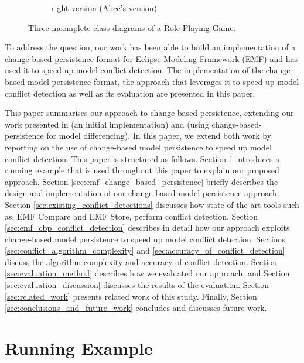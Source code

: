 \begin{figure}[]
\begin{subfigure}[t]{0.31\linewidth}
\caption{right version (Alice's version)}
\label{fig:class_diagram_right}
\end{subfigure}
\caption{Three incomplete class diagrams of a Role Playing Game.}
\label{fig:class_diagram_rpg}
\end{figure}

To address the question, our work has been able to build an implementation of a change-based persistence format for Eclipse Modeling Framework (EMF) \cite{eclipse2019emf} and has used it to speed up model conflict detection. The implementation of the change-based model persistence format, the approach that leverages it to speed up model conflict detection as well as its evaluation are presented in this paper. 

This paper summarises our approach to change-based persistence, extending our work presented in \cite{DBLP:conf/models/YohannisKP17} (an initial implementation) and \cite{yohannis2019efficient} (using change-based-persistence for model differencing). In this paper, we extend both work \cite{DBLP:conf/models/YohannisKP17,yohannis2019efficient} by reporting on the use of change-based model persistence to speed up model conflict detection. This paper is structured as follows. Section \ref{sec:running_example} introduces a running example that is used throughout this paper to explain our proposed approach. Section \ref{sec:emf_change_based_persistence} briefly describes the design and implementation of our change-based model persistence approach.  
Section \ref{sec:existing_conflict_detections} discusses how state-of-the-art tools such as, EMF Compare and EMF Store, perform conflict detection. 
Section \ref{sec:emf_cbp_conflict_detection} describes in detail how our approach exploits change-based model persistence to speed up model conflict detection. Sections \ref{sec:conflict_algorithm_complexity} and \ref{sec:accuracy_of_conflict_detection} discuss the algorithm complexity and accuracy of conflict detection. 
Section \ref{sec:evaluation_method} describes how we evaluated our approach, and Section \ref{sec:evaluation_discussion} discusses the results of the evaluation. Section \ref{sec:related_work} presents related work of this study. Finally, Section \ref{sec:conclusions_and_future_work} concludes and discusses future work.

\section{Running Example}
\label{sec:running_example}

